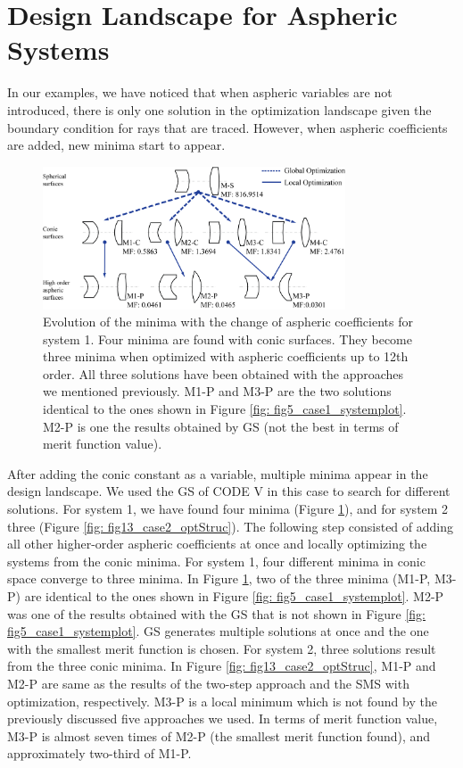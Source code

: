 \section{Design Landscape for Aspheric Systems}
In our examples, we have noticed that when aspheric variables are not introduced, there is only one solution in the optimization landscape given the boundary condition for rays that are traced. However, when aspheric coefficients are added, new minima start to appear. 

\begin{figure}[h!]
    \centering
    \includegraphics[width=0.8\textwidth]{chapter-5/figures/Fig12_System1_structure.png}
    \caption{Evolution of the minima with the change of aspheric coefficients for system 1. Four minima are found with conic surfaces. They become three minima when optimized with aspheric coefficients up to 12th order. All three solutions have been obtained with the approaches we mentioned previously. M1-P and M3-P are the two solutions identical to the ones shown in Figure \ref{fig: fig5_case1_systemplot}. M2-P is one the results obtained by GS (not the best in terms of merit function value). }
    \label{fig: fig12_case1_optStruc}
\end{figure}

After adding the conic constant as a variable, multiple minima appear in the design landscape. We used the GS of CODE V in this case to search for different solutions. For system 1, we have found four minima (Figure \ref{fig: fig12_case1_optStruc}), and for system 2 three (Figure \ref{fig: fig13_case2_optStruc}). 
The following step consisted of adding all other higher-order aspheric coefficients at once and locally optimizing the systems from the conic minima. For system 1, four different minima in conic space converge to three minima. In Figure \ref{fig: fig12_case1_optStruc}, two of the three minima (M1-P, M3-P) are identical to the ones shown in Figure \ref{fig: fig5_case1_systemplot}. M2-P was one of the results obtained with the GS that is not shown in Figure \ref{fig: fig5_case1_systemplot}. GS generates multiple solutions at once and the one with the smallest merit function is chosen. For system 2, three solutions result from the three conic minima. In Figure \ref{fig: fig13_case2_optStruc}, M1-P and M2-P are same as the results of the two-step approach and the SMS with optimization, respectively. M3-P is a local minimum which is not found by the previously discussed five approaches we used. In terms of merit function value, M3-P is almost seven times of M2-P (the smallest merit function found), and approximately two-third of M1-P.

